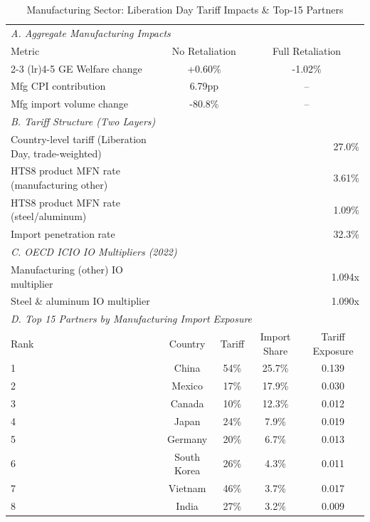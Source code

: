 \begin{table}[H]
\centering
\caption{Manufacturing Sector: Liberation Day Tariff Impacts \& Top-15 Partners}
\label{tab:manufacturing_top15}
\begin{tabular}{lcccc}
\toprule
\multicolumn{5}{l}{\textit{A. Aggregate Manufacturing Impacts}} \\[4pt]
Metric & \multicolumn{2}{c}{No Retaliation} & \multicolumn{2}{c}{Full Retaliation} \\
\cmidrule(lr){2-3} \cmidrule(lr){4-5}
GE Welfare change & \multicolumn{2}{c}{+0.60\%} & \multicolumn{2}{c}{-1.02\%} \\
Mfg CPI contribution & \multicolumn{2}{c}{6.79pp} & \multicolumn{2}{c}{--} \\
Mfg import volume change & \multicolumn{2}{c}{-80.8\%} & \multicolumn{2}{c}{--} \\
\midrule
\multicolumn{5}{l}{\textit{B. Tariff Structure (Two Layers)}} \\[2pt]
Country-level tariff (Liberation Day, trade-weighted) & \multicolumn{4}{r}{27.0\%} \\
HTS8 product MFN rate (manufacturing other) & \multicolumn{4}{r}{3.61\%} \\
HTS8 product MFN rate (steel/aluminum) & \multicolumn{4}{r}{1.09\%} \\
Import penetration rate & \multicolumn{4}{r}{32.3\%} \\
\midrule
\multicolumn{5}{l}{\textit{C. OECD ICIO IO Multipliers (2022)}} \\[2pt]
Manufacturing (other) IO multiplier & \multicolumn{4}{r}{1.094x} \\
Steel \& aluminum IO multiplier & \multicolumn{4}{r}{1.090x} \\
\midrule
\multicolumn{5}{l}{\textit{D. Top 15 Partners by Manufacturing Import Exposure}} \\
Rank & Country & Tariff & Import Share & Tariff Exposure \\
\midrule
1 & China & 54\% & 25.7\% & 0.139 \\
2 & Mexico & 17\% & 17.9\% & 0.030 \\
3 & Canada & 10\% & 12.3\% & 0.012 \\
4 & Japan & 24\% & 7.9\% & 0.019 \\
5 & Germany & 20\% & 6.7\% & 0.013 \\
6 & South Korea & 26\% & 4.3\% & 0.011 \\
7 & Vietnam & 46\% & 3.7\% & 0.017 \\
8 & India & 27\% & 3.2\% & 0.009 \\

\end{tabular}
\end{table}
